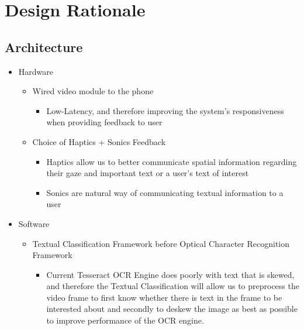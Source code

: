 \chapter{Design Rationale}

	\section{Architecture}
		\begin{itemize}
			\item Hardware
			\begin{itemize}
				\item Wired video module to the phone
				\begin{itemize}
					\item Low-Latency, and therefore improving the system’s responsiveness when providing feedback to user
				\end{itemize}
				\item Choice of Haptics + Sonics Feedback
				\begin{itemize}
					\item Haptics allow us to better communicate spatial information regarding their gaze and important text or a user’s text of interest
					\item Sonics are natural way of communicating textual information to a user
				\end{itemize}
			\end{itemize}


			\item Software
			\begin{itemize}
				\item Textual Classification Framework before Optical Character Recognition Framework
				\begin{itemize}
					\item Current Tesseract OCR Engine does poorly with text that is skewed, and therefore the Textual Classification will allow us to preprocess the video frame to first know whether there is text in the frame to be interested about and secondly to deskew the image as best as possible to improve performance of the OCR engine.
				\end{itemize}
			\end{itemize}
		\end{itemize}
\pagebreak
